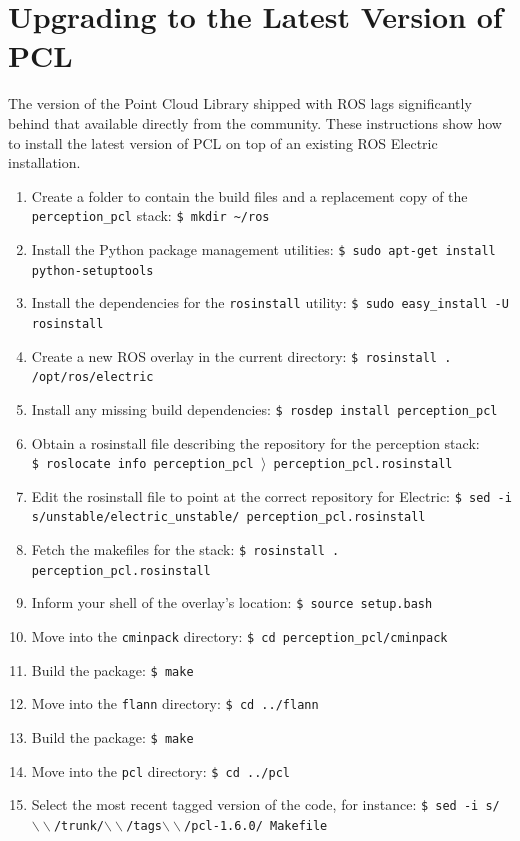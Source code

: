 \documentclass[12pt]{report}
\begin{document}
\section{Upgrading to the Latest Version of PCL}
\label{apx:upgrade}
The version of the Point Cloud Library shipped with ROS lags significantly behind that available directly from the community.  These instructions show how to install the latest version of PCL on top of an existing ROS Electric installation.
\begin{sloppypar}
\begin{enumerate}
\item{Create a folder to contain the build files and a replacement copy of the \texttt{perception\_pcl} stack: \texttt{\$\ mkdir \~{}/ros}}
\item{Install the Python package management utilities: \texttt{\$\ sudo apt-get install python-setuptools}}
\item{Install the dependencies for the \texttt{rosinstall} utility: \texttt{\$\ sudo easy\_install -U rosinstall}}
\item{Create a new ROS overlay in the current directory: \texttt{\$\ rosinstall . /opt/ros/electric}}
\item{Install any missing build dependencies: \texttt{\$\ rosdep install perception\_pcl}}
\item{Obtain a rosinstall file describing the repository for the perception stack: \texttt{\$\ roslocate info perception\_pcl $\rangle$ perception\_pcl.rosinstall}}
\item{Edit the rosinstall file to point at the correct repository for Electric: \texttt{\$\ sed -i s/unstable/electric\_unstable/ perception\_pcl.rosinstall }}
\item{Fetch the makefiles for the stack: \texttt{\$\ rosinstall . perception\_pcl.rosinstall}}
\item{Inform your shell of the overlay's location: \texttt{\$\ source setup.bash}}
\item{Move into the \texttt{cminpack} directory: \texttt{\$\ cd perception\_pcl/cminpack}}
\item{Build the package: \texttt{\$\ make}}
\item{Move into the \texttt{flann} directory: \texttt{\$\ cd ../flann}}
\item{Build the package: \texttt{\$\ make}}
\item{Move into the \texttt{pcl} directory: \texttt{\$\ cd ../pcl}}
\item{Select the most recent tagged version of the code, for instance: \texttt{\$\ sed -i s/$\backslash\backslash$/trunk/$\backslash\backslash$/tags$\backslash\backslash$/pcl-1.6.0/ Makefile}}

\end{enumerate}
\end{sloppypar}
\end{document}
